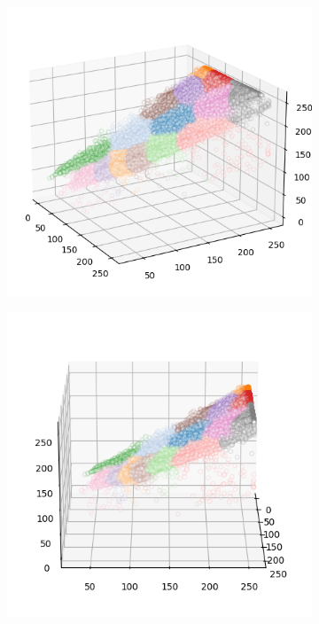 \begin{figure}[htbp]
\begin{subfigure}[t]{0.32\textwidth}
        \includegraphics[width=\linewidth]{../../python_code/plots/kmeans/cat-101/clusters_elev20_azim-30.png}
    \end{subfigure}
    \begin{subfigure}[t]{0.32\textwidth}
        \includegraphics[width=\linewidth]{../../python_code/plots/kmeans/cat-101/clusters_elev20_azim0.png}

\end{subfigure}
\end{figure}
